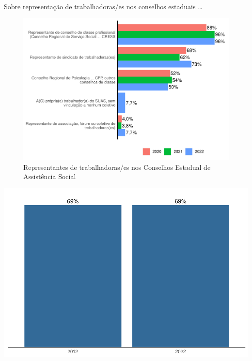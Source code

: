 \documentclass[
  brazilian]{report}
\begin{document}
Sobre representação de trabalhadoras/es nos conselhos estaduais \ldots{}

\begin{figure}
\includegraphics{Censo-SUAS-2022_files/figure-latex/trab_rep-1} \caption[Representantes de trabalhadoras/es nos Conselhos Estadual de Assistência Social]{Representantes de trabalhadoras/es nos Conselhos Estadual de Assistência Social}\label{fig:trab_rep}
\end{figure}

\includegraphics{Censo-SUAS-2022_files/figure-latex/unnamed-chunk-8-1}
\end{document}
